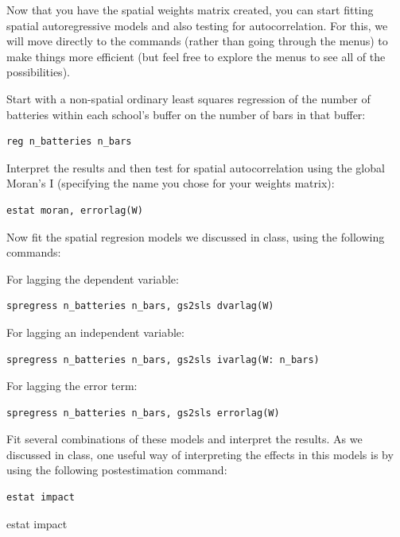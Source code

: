 \documentclass[]{book}
\begin{document}
Now that you have the spatial weights matrix created, you can start fitting spatial autoregressive models and also testing for autocorrelation. For this, we will move directly to the commands (rather than going through the menus) to make things more efficient (but feel free to explore the menus to see all of the possibilities).

Start with a non-spatial ordinary least squares regression of the number of batteries within each school's buffer on the number of bars in that buffer:

\begin{verbatim}
reg n_batteries n_bars
\end{verbatim}

Interpret the results and then test for spatial autocorrelation using the global Moran's I (specifying the name you chose for your weights matrix):

\begin{verbatim}
estat moran, errorlag(W)
\end{verbatim}

Now fit the spatial regresion models we discussed in class, using the following commands:

For lagging the dependent variable:

\begin{verbatim}
spregress n_batteries n_bars, gs2sls dvarlag(W)
\end{verbatim}

For lagging an independent variable:

\begin{verbatim}
spregress n_batteries n_bars, gs2sls ivarlag(W: n_bars)
\end{verbatim}

For lagging the error term:

\begin{verbatim}
spregress n_batteries n_bars, gs2sls errorlag(W)
\end{verbatim}

Fit several combinations of these models and interpret the results. As we discussed in class, one useful way of interpreting the effects in this models is by using the following postestimation command:

\begin{verbatim}
estat impact
\end{verbatim}

estat impact


\end{document}
